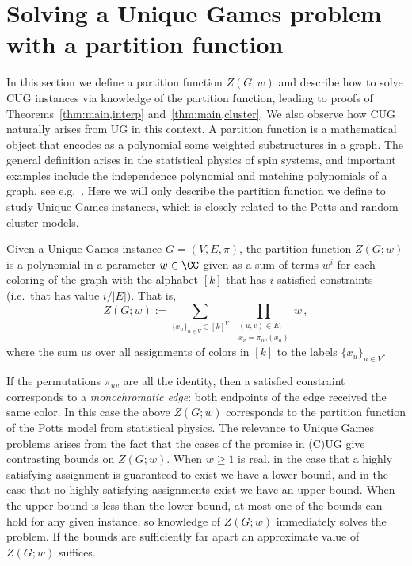 \section{Solving a Unique Games problem with a partition function}\label{sec:solveCUG}
%
In this section we define a partition function $Z(G;w)$ and describe how to solve CUG instances via knowledge of the partition function, leading to proofs of Theorems~\ref{thm:main,interp} and~\ref{thm:main,cluster}. 
We also observe how CUG naturally arises from UG in this context. 
%
A partition function is a mathematical object that encodes as a polynomial some weighted substructures in a graph. 
The general definition arises in the statistical physics of spin systems, and important examples include the independence polynomial and matching polynomials of a graph, see e.g.~\cite{Barvinok16}. 
Here we will only describe the partition function we define to study Unique Games instances, which is closely related to the Potts and random cluster models.
%
\begin{definition}\label{def:Z}
Given a Unique Games instance $G=(V, E, \pi)$, the partition function $Z(G;w)$ is a polynomial in a parameter $w\in\CC$ given as a sum of terms $w^{i}$ for each coloring of the graph with the alphabet $[k]$ that has $i$ satisfied constraints (i.e.\ that has value $i/|E|$).
That is,
\begin{equation}
Z(G; w) := \sum_{\{x_u\}_{u\in V}\in[k]^V}\;\prod_{\substack{(u,v)\in E,\\ x_v=\pi_{uv}(x_u)}}w\,,
\end{equation}
where the sum us over all assignments of colors in $[k]$ to the labels $\{x_u\}_{u\in V}$.
\end{definition}
%
If the permutations $\pi_{uv}$ are all the identity, then a satisfied constraint corresponds to a \emph{monochromatic edge}: both endpoints of the edge received the same color. 
In this case the above $Z(G;w)$ corresponds to the partition function of the Potts model from statistical physics. 
The relevance to Unique Games problems arises from the fact that the cases of the promise in (C)UG give contrasting bounds on $Z(G;w)$. 
When $w\ge 1$ is real, in the case that a highly satisfying assignment is guaranteed to exist we have a lower bound, and in the case that no highly satisfying assignments exist we have an upper bound. 
When the upper bound is less than the lower bound, at most one of the bounds can hold for any given instance, so knowledge of $Z(G;w)$ immediately solves the problem. 
If the bounds are sufficiently far apart an approximate value of $Z(G;w)$ suffices.  
